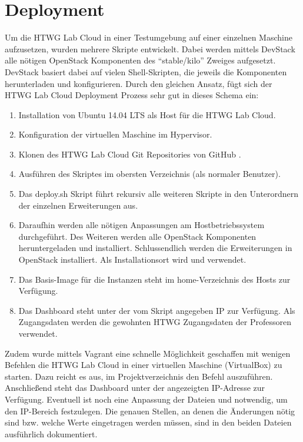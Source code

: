 \chapter{Deployment}

Um die HTWG Lab Cloud in einer Testumgebung auf einer einzelnen Maschine aufzusetzen, wurden mehrere  Skripte entwickelt.
Dabei werden mittels DevStack \cite{devstack} alle nötigen OpenStack Komponenten des \enquote{stable/kilo} Zweiges aufgesetzt.
DevStack basiert dabei auf vielen Shell-Skripten, die jeweils die Komponenten herunterladen und konfigurieren.
Durch den gleichen Ansatz, fügt sich der HTWG Lab Cloud Deployment Prozess sehr gut in dieses Schema ein:

\begin{enumerate}
\item Installation von Ubuntu 14.04 LTS als Host für die HTWG Lab Cloud.
\item Konfiguration der virtuellen Maschine im Hypervisor.
\item Klonen des HTWG Lab Cloud Git Repositories von GitHub \cite{git-source}.
\item Ausführen des  Skriptes im obersten Verzeichnis (als normaler Benutzer).
\item Das deploy.sh Skript führt rekursiv alle weiteren Skripte in den Unterordnern der einzelnen Erweiterungen aus.
\item Daraufhin werden alle nötigen Anpassungen am Hostbetriebssystem durchgeführt.  Des Weiteren werden alle OpenStack Komponenten heruntergeladen und installiert. Schlussendlich werden die Erweiterungen in OpenStack installiert. Als Installationsort wird  und  verwendet.
\item Das Basis-Image für die Instanzen steht im home-Verzeichnis des Hosts zur Verfügung.
\item Das Dashboard steht unter der vom Skript angegeben IP zur Verfügung. Als Zugangsdaten werden die gewohnten HTWG Zugangsdaten der Professoren verwendet.
\end{enumerate}

Zudem wurde mittels Vagrant \cite{Vagrant} eine schnelle Möglichkeit geschaffen mit wenigen Befehlen die HTWG Lab Cloud in einer virtuellen Maschine (VirtualBox) zu starten. 
Dazu reicht es aus, im Projektverzeichnis den Befehl  auszuführen.
Anschließend steht das Dashboard unter der angezeigten IP-Adresse zur Verfügung.
Eventuell ist noch eine Anpassung der Dateien  und  notwendig, um den IP-Bereich festzulegen. Die genauen Stellen, an denen die Änderungen nötig sind bzw. welche Werte eingetragen werden müssen, sind in den beiden Dateien ausführlich dokumentiert.

